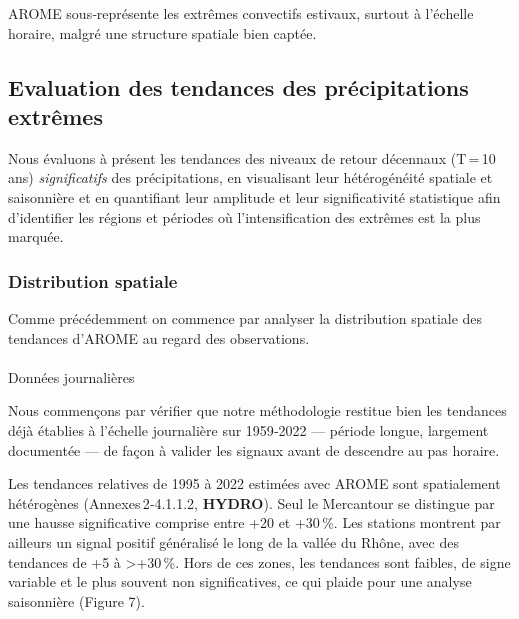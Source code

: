 \documentclass[
  article,
  nofooter,
  noheadings]{jss}
\makeatletter
\let\oldparagraph\paragraph
\renewcommand{\paragraph}{
    \@ifstar
      \xxxParagraphStar
      \xxxParagraphNoStar
  }
\newcommand{\xxxParagraphStar}[1]{\oldparagraph*{#1}\mbox{}}
\newcommand{\xxxParagraphNoStar}[1]{\oldparagraph{#1}\mbox{}}
\makeatother
\begin{document}

\begin{tcolorbox}[enhanced jigsaw, opacityback=0, leftrule=.75mm, breakable, left=2mm, arc=.35mm, rightrule=.15mm, bottomrule=.15mm, toprule=.15mm, colback=white, colframe=quarto-callout-color-frame]

AROME sous‑représente les extrêmes convectifs estivaux, surtout à
l'échelle horaire, malgré une structure spatiale bien captée.

\end{tcolorbox}

\subsection{Evaluation des tendances des précipitations
extrêmes}\label{evaluation-des-tendances-des-pruxe9cipitations-extruxeames}

Nous évaluons à présent les tendances des niveaux de retour décennaux
(T\,=\,10\,ans) \emph{significatifs} des précipitations, en visualisant
leur hétérogénéité spatiale et saisonnière et en quantifiant leur
amplitude et leur significativité statistique afin d'identifier les
régions et périodes où l'intensification des extrêmes est la plus
marquée.

\subsubsection{Distribution spatiale}\label{distribution-spatiale-1}

Comme précédemment on commence par analyser la distribution spatiale des
tendances d'AROME au regard des observations.

\paragraph{Données journalières}\label{donnuxe9es-journaliuxe8res}

Nous commençons par vérifier que notre méthodologie restitue bien les
tendances déjà établies à l'échelle journalière sur 1959‑2022 ---
période longue, largement documentée --- de façon à valider les signaux
avant de descendre au pas horaire.

Les tendances relatives de 1995 à 2022 estimées avec AROME sont
spatialement hétérogènes (Annexes\,2‑4.1.1.2, \textbf{HYDRO}). Seul le
Mercantour se distingue par une hausse significative comprise entre +20
et +30\,\%. Les stations montrent par ailleurs un signal positif
généralisé le long de la vallée du Rhône, avec des tendances de +5 à
\textgreater+30\,\%. Hors de ces zones, les tendances sont faibles, de
signe variable et le plus souvent non significatives, ce qui plaide pour
une analyse saisonnière (Figure 7).
\end{document}
